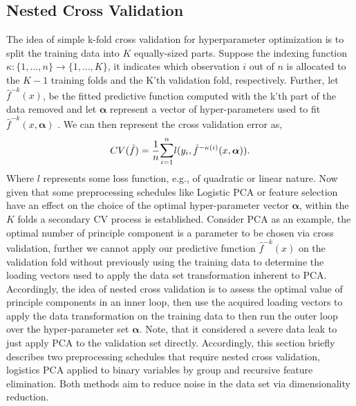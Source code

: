 \documentclass[a4paper,12pt, headsepline]{scrartcl}
\numberwithin{equation}{section}
\begin{document}
\subsection{Nested Cross Validation}\label{subsec:nest}
The idea of simple k-fold cross validation for hyperparameter optimization is to split the training data into $K$ equally-sized parts. Suppose the indexing function $\kappa: \{1, ..., n\} \rightarrow \{1, ..., K\}$, it indicates which observation $i$ out of $n$ is allocated to the $K - 1$ training folds and the K'th validation fold, respectively. Further, let $\hat f^{-k}(x)$, be the fitted predictive function computed with the k'th part of the data removed and let $\bm \alpha$ represent a vector of hyper-parameters used to fit $\hat f^{-k}(x, \bm{\alpha})$ \citep{hastie09}. We can then represent the cross validation error as,
\begin{gather*}
	CV(\hat f) = \frac{1}{n} \mathlarger{\sum}\limits_{i = 1}^{n} l(y_i, \hat f^{-\kappa(i)}(x, \bm \alpha)).
\end{gather*}
Where $l$ represents some loss function, e.g., of quadratic or linear nature.
Now given that some preprocessing schedules like Logistic PCA or feature selection have an effect on the choice of the optimal hyper-parameter vector $\bm \alpha$, within the $K$ folds a secondary CV process is established. Consider PCA as an example, the optimal number of principle component is a parameter to be chosen via cross validation, further we cannot apply our predictive function $\hat f^{-k}(x)$ on the validation fold without previously using the training data to determine the loading vectors used to apply the data set transformation inherent to PCA. Accordingly, the idea of nested cross validation is to assess the optimal value of principle components in an inner loop, then use the acquired loading vectors to apply the data transformation on the training data to then run the outer loop over the hyper-parameter set $\bm \alpha$. Note, that it considered a severe data leak to just apply PCA to the validation set directly. Accordingly, this section briefly describes two preprocessing schedules that require nested cross validation, logistics PCA applied to binary variables by group and recursive feature elimination. Both methods aim to reduce noise in the data set via dimensionality reduction.
\end{document}
